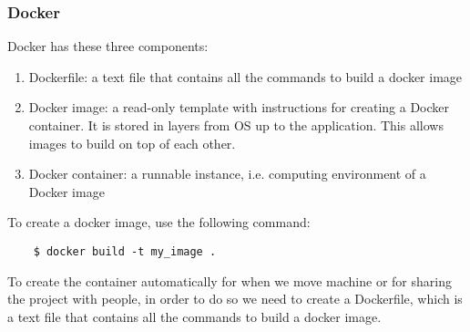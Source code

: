 \documentclass[12pt,a4paper]{article}
\begin{document}
\subsubsection{Docker}
Docker has these three components:
\begin{enumerate}
    \item Dockerfile: a text file that contains all the commands to build a docker image
    \item Docker image: a read-only template with instructions for creating a Docker container. It is stored in layers from OS up to the application. This allows images to build on top of each other. 
    \item Docker container: a runnable instance, i.e. computing environment of a Docker image
\end{enumerate}
To create a docker image, use the following command:
\begin{lstlisting}
    $ docker build -t my_image .
\end{lstlisting}
To create the container automatically for when we move machine or for sharing the project with people, in order to do so we need to create a Dockerfile, which is a text file that contains all the commands to build a docker image.\\
\end{document}
